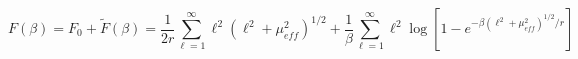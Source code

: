 \begin{equation}
F\left(\beta \right)=F_{0}+\widetilde{F}\left(\beta \right)=\frac{1}{2r}\sum _{\ell =1}^{\infty }\ell ^{2}\left(\ell ^{2}+\mu _{eff}^{2}\right)^{1/2}+\frac{1}{\beta }\sum _{\ell =1}^{\infty }\ell ^{2}\log \left[1-e^{-\beta \left(\ell ^{2}+\mu _{eff}^{2}\right)^{1/2}/r}\right]\end{equation}

